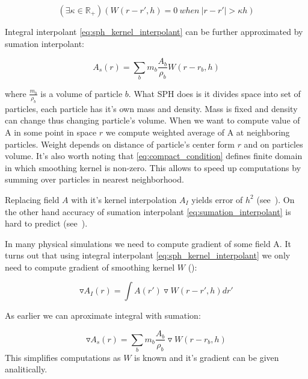 \begin{equation}
\label{eq:compact_condition}
(\exists \kappa \in \mathbb{R}_+ )(W(r-r', h) = 0~when~|r-r'| > \kappa h)
\end{equation}

Integral interpolant \ref{eq:sph_kernel_interpolant} can be further approximated by sumation interpolant:

\begin{equation}
\label{eq:sumation_interpolant}
A_s(r) = \sum_{b}m_b\frac{A_b}{\rho_b}W(r-r_b,h)
\end{equation}

where $\frac{m_b}{\rho_b}$ is a volume of particle $b$. What SPH does is it divides space into set of particles, each particle has it's own mass and density. Mass is fixed and density can change thus changing particle's volume. When we want to compute value of A in some point in space $r$ we compute weighted average of A at neighboring particles. Weight depends on distance of particle's center form $r$ and on particles volume. 
It's also worth noting that \ref{eq:compact_condition} defines finite domain in which smoothing kernel is non-zero. This allows to speed up computations by summing over particles in nearest neighborhood.

Replacing field $A$ with it's kernel interpolation $A_I$ yields error of $h^2$ (see~\cite[section 2.2.1]{Liu}). On the other hand accuracy of sumation interpolant \ref{eq:sumation_interpolant} is hard to predict (see~\cite[section 12.1]{Monaghan1992}).

In many physical simulations we need to compute gradient of some field A. It turns out that using integral interpolant \ref{eq:sph_kernel_interpolant} we only need to compute gradient of smoothing kernel $W$ (\cite[section 2.2.2]{Liu}):

\begin{equation}
\label{eq:integral_interpolant_gradient}
\triangledown A_I(r) = \int A(r') \triangledown W(r - r', h)dr'
\end{equation}

As earlier we can aproximate integral with sumation:

\begin{equation}
\label{eq:sumation_interpolant_gradient}
\triangledown A_s(r) = \sum_{b}m_b\frac{A_b}{\rho_b}\triangledown W(r-r_b,h) 
\end{equation}
This simplifies computations as $W$ is known and it's gradient can be given analitically. 

